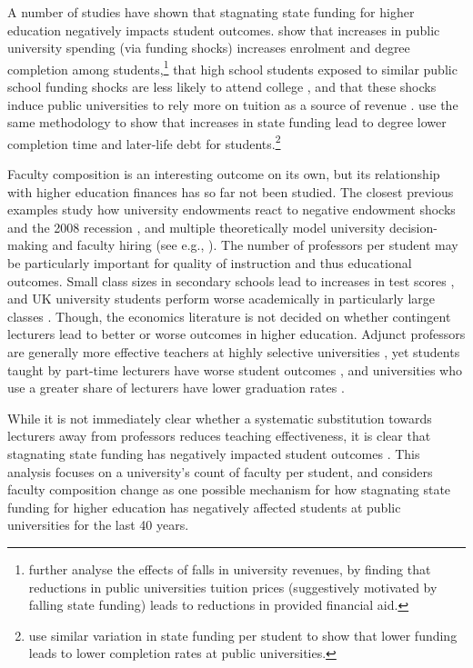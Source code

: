 A number of studies have shown that stagnating state funding for higher education negatively impacts student outcomes.
\cite{NBERw23736} show that increases in public university spending (via funding shocks) increases enrolment and degree completion among students,\footnote{
    \cite{miller2022making} further analyse the effects of falls in university revenues, by finding that reductions in public universities tuition prices (suggestively motivated by falling state funding) leads to reductions in provided financial aid.
}
that high school students exposed to similar public school funding shocks are less likely to attend college \citep{jackson2021school}, and that these shocks induce public universities to rely more on tuition as a source of revenue \citep{bound2019public}.
\cite{NBERw27885} use the same methodology to show that increases in state funding lead to degree lower completion time and later-life debt for students.\footnote{
    \cite{bound2007cohort} use similar variation in state funding per student to show that lower funding leads to lower completion rates at public universities.
}

Faculty composition is an interesting outcome on its own, but its relationship with higher education finances has so far not been studied.
The closest previous examples study  how university endowments react to negative endowment shocks \citep{brown2014endowment} and the 2008 recession \citep{turner2014impact}, and multiple theoretically model university decision-making and faculty hiring (see e.g., \citealt{abe2015implications,johnson2009jep,NBERc13879}).
The number of professors per student may be particularly important for quality of instruction and thus educational outcomes.
Small class sizes in secondary schools lead to increases in test scores \citep{angrist1999using}, and UK university students perform worse academically in particularly large classes \citep{bandiera2010heterogeneous}.
Though, the economics literature is not decided on whether contingent lecturers lead to better or worse outcomes in higher education.
Adjunct professors are generally more effective teachers at highly selective universities \citep{bettinger2010does,figlio2015tenure}, yet students taught by part-time lecturers have worse student outcomes \citep{zhu2021limited}, and universities who use a greater share of lecturers have lower graduation rates \citep{ehrenberg2005tenured}.

While it is not immediately clear whether a systematic substitution towards lecturers away from professors reduces teaching effectiveness, it is clear that stagnating state funding has negatively impacted student outcomes \citep{NBERw23736,NBERw27885}.
This analysis focuses on a university's count of faculty per student, and considers faculty composition change as one possible mechanism for how stagnating state funding for higher education has negatively affected students at public universities for the last 40 years.

